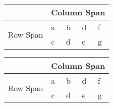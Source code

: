 \begin{table}[]
    \centering
    \begin{tabular}{lllll}
        \hline
        \textbf{} & \multicolumn{4}{l}{Column Span} \\ \hline
        \multirow{2}{*}{Row Span} & a & b & d & f \\
         & c & d & e & g \\ \hline
        \end{tabular}
\end{table}


\begin{table}[]
    \centering
    \begin{tabular}{lllll}
        \hline
        \textbf{} & \multicolumn{4}{l}{Column Span} \\ \hline
        \multirow{2}{*}{Row Span} & a & b & d & f \\
         & c & d & e & g \\ \hline
        \end{tabular}
\end{table}
